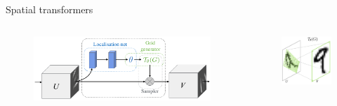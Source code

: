 \documentclass[xcolor=pdftex,dvipsnames,table,mathserif]{beamer}
\begin{document}
\begin{frame}{Spatial transformers~\cite{jaderberg_spatial_2016}}

  \begin{columns}
    \begin{column}{.75\textwidth}
      \begin{figure}[ht]
        \centering
        \includegraphics[width=\textwidth]{spatial_transformer}
      \end{figure}

    \end{column}

    \begin{column}{.25\textwidth}
      \begin{figure}[ht]
        \centering
        \includegraphics[width=\textwidth]{sampling_grid}
      \end{figure}
    \end{column}
  \end{columns}


\end{frame}
\end{document}
